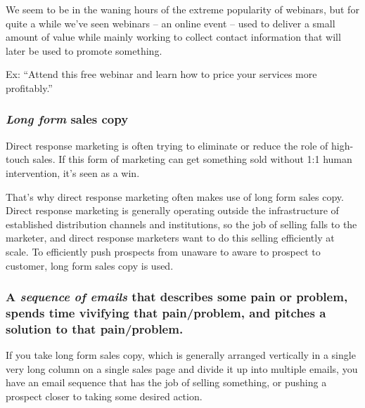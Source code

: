 \documentclass[13pt,]{tufte-handout}
\begin{document}
We seem to be in the waning hours of the extreme popularity of webinars,
but for quite a while we've seen webinars -- an online event -- used to
deliver a small amount of value while mainly working to collect contact
information that will later be used to promote something.

Ex: ``Attend this free webinar and learn how to price your services more
profitably.''

\hypertarget{long-form-sales-copy}{%
\subsubsection{\texorpdfstring{\emph{Long form} sales
copy}{Long form sales copy}}\label{long-form-sales-copy}}

Direct response marketing is often trying to eliminate or reduce the
role of high-touch sales. If this form of marketing can get something
sold without 1:1 human intervention, it's seen as a win.

That's why direct response marketing often makes use of long form sales
copy. Direct response marketing is generally operating outside the
infrastructure of established distribution channels and institutions, so
the job of selling falls to the marketer, and direct response marketers
want to do this selling efficiently at scale. To efficiently push
prospects from unaware to aware to prospect to customer, long form sales
copy is used.

\hypertarget{a-sequence-of-emails-that-describes-some-pain-or-problem-spends-time-vivifying-that-painproblem-and-pitches-a-solution-to-that-painproblem.}{%
\subsubsection{\texorpdfstring{A \emph{sequence of emails} that
describes some pain or problem, spends time vivifying that pain/problem,
and pitches a solution to that
pain/problem.}{A sequence of emails that describes some pain or problem, spends time vivifying that pain/problem, and pitches a solution to that pain/problem.}}\label{a-sequence-of-emails-that-describes-some-pain-or-problem-spends-time-vivifying-that-painproblem-and-pitches-a-solution-to-that-painproblem.}}

If you take long form sales copy, which is generally arranged vertically
in a single very long column on a single sales page and divide it up
into multiple emails, you have an email sequence that has the job of
selling something, or pushing a prospect closer to taking some desired
action.
\end{document}
